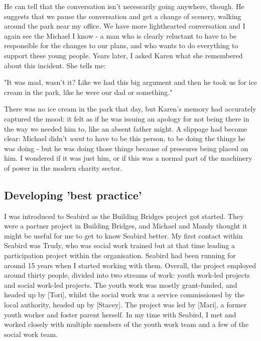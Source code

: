He can tell that the conversation isn't necessarily going anywhere, though. He suggests that we pause the conversation and get a change of scenery, walking around the park near my office. We have more lighthearted conversation and I again see the Michael I know - a man who is clearly reluctant to have to be responsible for the changes to our plans, and who wants to do everything to support these young people. Years later, I asked Karen what she remembered about this incident. She tells me:

"It was mad, wasn't it? Like we had this big argument and then he took us for ice cream in the park, like he were our dad or something."

There was no ice cream in the park that day, but Karen's memory had accurately captured the mood: it felt as if he was issuing an apology for not being there in the way we needed him to, like an absent father might. A slippage had become clear: Michael didn't \textit{want} to have to be this person, to be doing the things he was doing - but he was doing those things because of pressures being placed on him. I wondered if it was just him, or if this was a normal part of the machinery of power in the modern charity sector.

\subsection{Developing 'best practice'}
I was introduced to Seabird as the Building Bridges project got started. They were a partner project in Building Bridges, and Michael and Mandy thought it might be useful for me to get to know Seabird better. My first contact within Seabird was Trudy, who was social work trained but at that time leading a participation project within the organisation. Seabird had been running for around 15 years when I started working with them. Overall, the project employed around thirty people, divided into two streams of work: youth work-led projects and social work-led projects. The youth work was mostly grant-funded, and headed up by [Tori], whilst the social work was a service commissioned by the local authority, headed up by [Stacey]. The project was led by [Mari], a former youth worker and foster parent herself. In my time with Seabird, I met and worked closely with multiple members of the youth work team and a few of the social work team. 

